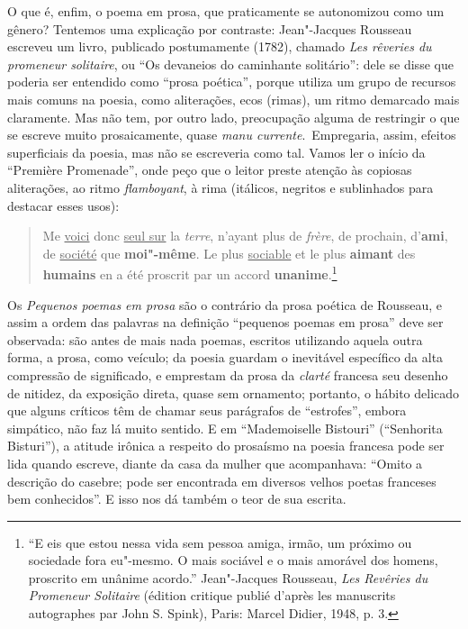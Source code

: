 O que é, enfim, o poema em prosa, que praticamente se autonomizou como
um gênero? Tentemos uma explicação por contraste: Jean"-Jacques
Rousseau escreveu um livro, publicado postumamente (1782), chamado
\textit{Les rêveries du promeneur solitaire}, ou “Os devaneios do
caminhante solitário”: dele se disse que poderia ser entendido como
“prosa poética”, porque utiliza um grupo de recursos mais comuns na
poesia, como aliterações, ecos (rimas), um ritmo demarcado mais
claramente. Mas não tem, por outro lado, preocupação alguma de
restringir o que se escreve muito prosaicamente, quase \textit{manu
currente}.~Empregaria, assim, efeitos superficiais da poesia, mas não
se escreveria como tal. Vamos ler o início da “Première Promenade”,
onde peço que o leitor preste atenção às copiosas aliterações, ao ritmo
\textit{flamboyant}, à rima (itálicos, negritos e sublinhados para
destacar esses usos):


\begin{quote}
Me \underline{voici} donc \underline{seul sur} la \textit{terre}, n’ayant plus
de \textit{frère}, de prochain, d’\textbf{ami}, de \underline{société} que
\textbf{moi"-même}. Le plus \underline{sociable} et le plus \textbf{aimant} des \textbf{humains} en a été
proscrit par un accord \textbf{unanime}.\footnote{ “E eis que estou nessa vida sem pessoa amiga, irmão, um próximo ou
sociedade fora eu"-mesmo. O mais sociável e o mais amorável dos homens,
proscrito em unânime acordo.” Jean"-Jacques Rousseau,  \textit{Les
Revêries du Promeneur Solitaire} (édition critique publié d’après les
manuscrits autographes par John S. Spink), Paris: Marcel
Didier, 1948, p. 3.}
\end{quote}

Os \textit{Pequenos poemas em prosa} são o contrário da prosa poética de Rousseau,
 e assim a ordem das palavras na definição “pequenos poemas em prosa” 
deve ser observada: são antes de mais nada poemas, escritos utilizando 
aquela outra forma, a prosa, como veículo; da poesia guardam o inevitável 
específico da alta compressão de significado, e emprestam da prosa da \textit{clarté}
 francesa seu desenho de nitidez, da exposição direta, quase sem ornamento; 
portanto, o hábito delicado que alguns críticos têm de chamar 
seus parágrafos de “estrofes”, embora simpático, não faz lá muito sentido. E
em “Mademoiselle Bistouri” (“Senhorita Bisturi”), a atitude irônica a
respeito do prosaísmo na poesia francesa pode ser lida quando escreve,
diante da casa da mulher que acompanhava: “Omito a descrição do
casebre; pode ser encontrada em diversos velhos poetas franceses bem
conhecidos”. E isso nos dá também o teor de sua escrita.

